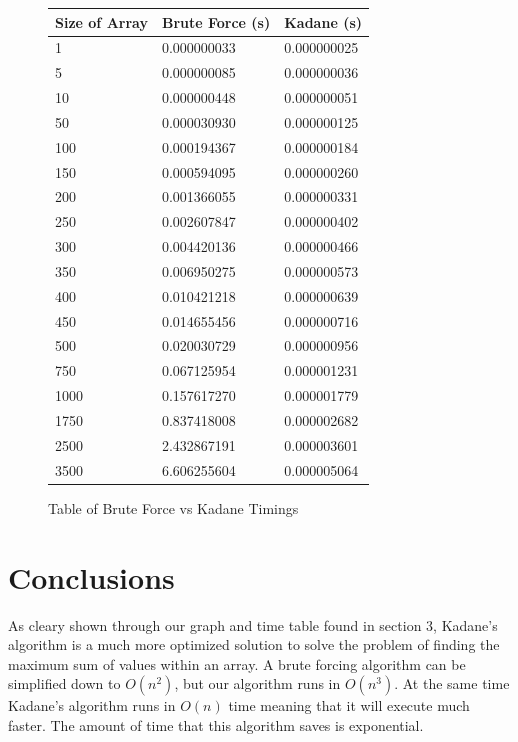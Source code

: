 \documentclass[10pt, letterpaper]{article}
\begin{document}
	
	\begin{figure}[!htb]
	\begin{center}
	\caption{
		\label{fig:time-table} Table of Brute Force vs Kadane Timings
	}
	\medskip
	\begin{tabular}{ | p{2cm} | l | l | }
			\hline
			Size of Array & Brute Force (s) & Kadane (s) \\ \hline
			1 & 0.000000033 & 0.000000025 \\ \hline
			5 & 0.000000085 & 0.000000036 \\ \hline
			10 & 0.000000448 & 0.000000051 \\ \hline
			50 & 0.000030930 & 0.000000125 \\ \hline
			100 & 0.000194367 & 0.000000184 \\ \hline
			150 & 0.000594095 & 0.000000260 \\ \hline
			200 & 0.001366055 & 0.000000331 \\ \hline
			250 & 0.002607847 & 0.000000402 \\ \hline
			300 & 0.004420136 & 0.000000466 \\ \hline
			350 & 0.006950275 & 0.000000573 \\ \hline
			400 & 0.010421218 & 0.000000639 \\ \hline
			450 & 0.014655456 & 0.000000716 \\ \hline
			500 & 0.020030729 & 0.000000956 \\ \hline
			750 & 0.067125954 & 0.000001231 \\ \hline
			1000 & 0.157617270 & 0.000001779 \\ \hline
			1750 & 0.837418008 & 0.000002682 \\ \hline
			2500 & 2.432867191 & 0.000003601 \\ \hline
			3500 & 6.606255604 & 0.000005064 \\ \hline
		\end{tabular}
	\end{center}
\end{figure}
	\section{Conclusions}
	As cleary shown through our graph and time table found in section 3,
	Kadane's algorithm is a much more optimized solution to solve the problem of finding the maximum sum of values within an array. 
	A brute forcing algorithm can be simplified down to $O(n^2)$, but our algorithm runs in $O(n^3)$.
	At the same time Kadane's algorithm runs in $O(n)$ time meaning that it will execute much faster.
	The amount of time that this algorithm saves is exponential.
	
\end{document}
